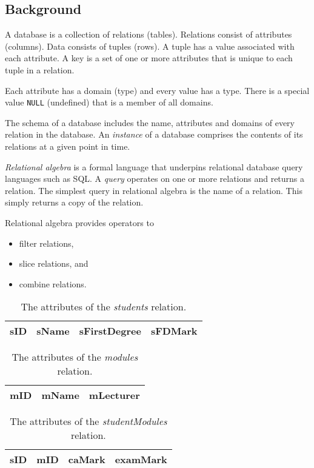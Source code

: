 \subsection{Background}

A database is a collection of relations (tables).
Relations consist of attributes (columns).
Data consists of tuples (rows).
A tuple has a value associated with each attribute.
A key is a set of one or more attributes that is unique to each tuple in a relation.

Each attribute has a domain (type) and every value has a type.
There is a special value \texttt{NULL} (undefined) that is a member of all domains.

The schema of a database includes the name, attributes and domains of every relation in the database.
An \emph{instance} of a database comprises the contents of its relations at a given point in time.

\emph{Relational algebra} is a formal language that underpins relational database query languages such as SQL\@.
A \emph{query} operates on one or more relations and returns a relation.
The simplest query in relational algebra is the name of a relation.
This simply returns a copy of the relation.

Relational algebra provides operators to
\begin{itemize}
  \item filter relations,
  \item slice relations, and
  \item combine relations.
\end{itemize}

\begin{table}[htp]
  \centering
  \caption*{The attributes of the \emph{students} relation.}
  \begin{tabular}{llll}
    \toprule
    sID & sName & sFirstDegree & sFDMark \\
    \bottomrule
  \end{tabular}
\end{table}

\begin{table}[htp]
  \centering
  \caption*{The attributes of the \emph{modules} relation.}
  \begin{tabular}{lll}
    \toprule
    mID & mName & mLecturer \\
    \bottomrule
  \end{tabular}
\end{table}

\begin{table}[htp]
  \centering
  \caption*{The attributes of the \emph{studentModules} relation.}
  \begin{tabular}{llll}
    \toprule
    sID & mID & caMark & examMark \\
    \bottomrule
  \end{tabular}
\end{table}

